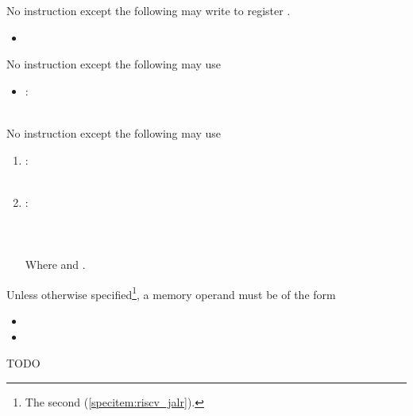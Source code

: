 \specitem
No instruction except the following may write to register \xsp.

\begin{itemize}
    \item {}
\end{itemize}


\specitem
No instruction except the following may use 

\begin{itemize}
    \item
        : \\
         \\
\end{itemize}

\specitem
\label{specitem:riscv_jalr}
No instruction except the following may use 

\begin{enumerate}
    \item
        : \\
         \\
    \item
        : \\
         \\
         \\ \\
        Where  and .
\end{enumerate}


\specitem
Unless otherwise specified\footnote{The second   (\ref{specitem:riscv_jalr}).}, a memory operand must be of the form

\begin{itemize}
    \item {}
    \item {}
\end{itemize}


TODO

\let\xbase\undefined
\let\xaddr\undefined
\let\xret\undefined
\let\xsp\undefined
\let\bundlesize\undefined
\let\bundlemask\undefined
